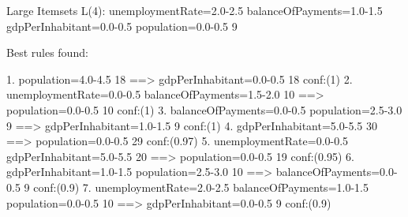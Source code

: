 Large Itemsets L(4):
unemploymentRate=2.0-2.5 balanceOfPayments=1.0-1.5 gdpPerInhabitant=0.0-0.5 population=0.0-0.5 9

Best rules found:

 1. population=4.0-4.5 18 ==> gdpPerInhabitant=0.0-0.5 18    conf:(1)
 2. unemploymentRate=0.0-0.5 balanceOfPayments=1.5-2.0 10 ==> population=0.0-0.5 10    conf:(1)
 3. balanceOfPayments=0.0-0.5 population=2.5-3.0 9 ==> gdpPerInhabitant=1.0-1.5 9    conf:(1)
 4. gdpPerInhabitant=5.0-5.5 30 ==> population=0.0-0.5 29    conf:(0.97)
 5. unemploymentRate=0.0-0.5 gdpPerInhabitant=5.0-5.5 20 ==> population=0.0-0.5 19    conf:(0.95)
 6. gdpPerInhabitant=1.0-1.5 population=2.5-3.0 10 ==> balanceOfPayments=0.0-0.5 9    conf:(0.9)
 7. unemploymentRate=2.0-2.5 balanceOfPayments=1.0-1.5 population=0.0-0.5 10 ==> gdpPerInhabitant=0.0-0.5 9    conf:(0.9)

